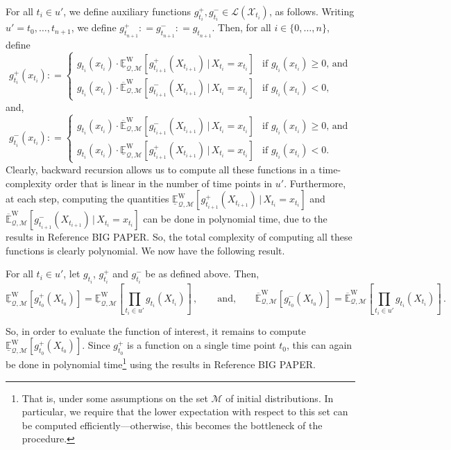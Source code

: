 \documentclass[twoside,11pt]{article}
\newcommand{\states}{\mathcal{X}}
\newcommand{\lexp}{\underline{\mathbb{E}}_{\rateset,\mathcal{M}}^\mathrm{W}}
\newcommand{\uexp}{\overline{\mathbb{E}}_{\rateset,\mathcal{M}}^\mathrm{W}}
\newcommand{\gambles}{\mathcal{L}}
\newcommand{\rateset}{\mathcal{Q}}
\newcommand{\coloneqq}{:\!=}
\begin{document}
For all $t_i\in u'$, we define auxiliary functions $g_{t_i}^+,g_{t_i}^-\in\gambles(\states_{t_i})$, as follows. Writing $u'=t_0,\ldots,t_{n+1}$, we define $g_{t_{n+1}}^+\coloneqq g_{t_{n+1}}^-\coloneqq g_{t_{n+1}}$. Then, for all $i\in\{0,\ldots,n\}$, define
\begin{equation*}
g_{t_i}^+(x_{t_i}) \coloneqq \left\{\begin{array}{ll}
g_{t_i}(x_{t_i})\cdot\lexp[g_{t_{i+1}}^+(X_{t_{i+1}})\,\vert\, X_{t_i}=x_{t_i}] & \text{if $g_{t_i}(x_{t_i})\geq 0$, and} \\
g_{t_i}(x_{t_i})\cdot\uexp[g_{t_{i+1}}^-(X_{t_{i+1}})\,\vert\, X_{t_i}=x_{t_i}] & \text{if $g_{t_i}(x_{t_i})<0$,}
\end{array}\right.
\end{equation*}
and,
\begin{equation*}
g_{t_i}^-(x_{t_i}) \coloneqq \left\{\begin{array}{ll}
g_{t_i}(x_{t_i})\cdot\uexp[g_{t_{i+1}}^-(X_{t_{i+1}})\,\vert\, X_{t_i}=x_{t_i}] & \text{if $g_{t_i}(x_{t_i})\geq 0$, and} \\
g_{t_i}(x_{t_i})\cdot\lexp[g_{t_{i+1}}^+(X_{t_{i+1}})\,\vert\, X_{t_i}=x_{t_i}] & \text{if $g_{t_i}(x_{t_i})<0$.}
\end{array}\right.
\end{equation*}
Clearly, backward recursion allows us to compute all these functions in a time-complexity order that is linear in the number of time points in $u'$. Furthermore, at each step, computing the quantities $\lexp[g_{t_{i+1}}^+(X_{t_{i+1}})\,\vert\, X_{t_i}=x_{t_i}]$ and $\uexp[g_{t_{i+1}}^-(X_{t_{i+1}})\,\vert\, X_{t_i}=x_{t_i}]$ can be done in polynomial time, due to the results in Reference BIG PAPER. So, the total complexity of computing all these functions is clearly polynomial. We now have the following result.
\begin{proposition}\label{prop:computing_product_funcs}
For all $t_i\in u'$, let $g_{t_i}$, $g_{t_i}^+$ and $g_{t_i}^-$ be as defined above. Then,
\begin{equation*}
\lexp\left[g_{t_0}^+(X_{t_0})\right] = \lexp\left[\prod_{t_i\in u'}g_{t_i}(X_{t_i})\right]\,,\quad\quad\text{and,}\quad\quad\uexp\left[g_{t_0}^-(X_{t_0})\right] = \uexp\left[\prod_{t_i\in u'}g_{t_i}(X_{t_i})\right]\,.
\end{equation*}
\end{proposition}
So, in order to evaluate the function of interest, it remains to compute $\lexp\left[g_{t_0}^+(X_{t_0})\right]$. Since $g_{t_0}^+$ is a function on a single time point $t_0$, this can again be done in polynomial time\footnote{That is, under some assumptions on the set $\mathcal{M}$ of initial distributions. In particular, we require that the lower expectation with respect to this set can be computed efficiently---otherwise, this becomes the bottleneck of the procedure.} using the results in Reference BIG PAPER.
\end{document}
